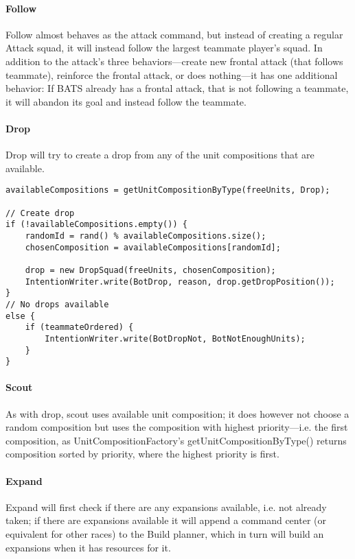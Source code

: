 \paragraph{Follow}
Follow almost behaves as the attack command, but instead of creating a regular Attack squad, it will
instead follow the largest teammate player’s squad. In addition to the attack’s three
behaviors—create new frontal attack (that follows teammate), reinforce the frontal attack, or does
nothing—it has one additional behavior: If BATS already has a frontal attack, that is not following
a teammate, it will abandon its goal and instead follow the teammate.

\paragraph{Drop}
Drop will try to create a drop from any of the unit compositions that are available.
\begin{lstlisting}[label={lst:order_drop},caption={Pseudo-code for the drop command}]
availableCompositions = getUnitCompositionByType(freeUnits, Drop);

// Create drop
if (!availableCompositions.empty()) {
	randomId = rand() % availableCompositions.size();
	chosenComposition = availableCompositions[randomId];

	drop = new DropSquad(freeUnits, chosenComposition);
	IntentionWriter.write(BotDrop, reason, drop.getDropPosition());
}
// No drops available
else {
	if (teammateOrdered) {
		IntentionWriter.write(BotDropNot, BotNotEnoughUnits);
	}
}
\end{lstlisting}

\paragraph{Scout}
As with drop, scout uses available unit composition; it does however not choose a random composition
but uses the composition with highest priority—i.e. the first composition, as
UnitCompositionFactory’s getUnitCompositionByType() returns composition sorted by priority, where
the highest priority is first.

\paragraph{Expand}
Expand will first check if there are any expansions available, i.e. not already taken; if there are
expansions available it will append a command center (or equivalent for other races) to the Build
planner, which in turn will build an expansions when it has resources for it.

